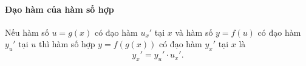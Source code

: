\paragraph{Đạo hàm của hàm số hợp}
\begin{dl}
	Nếu hàm số $u=g(x)$ có đạo hàm $u_x'$ tại $x$ và hàm số $y=f(u)$ có đạo hàm $y_u'$ tại $u$ thì hàm số hợp $y=f(g(x))$ có đạo hàm $y_x'$ tại $x$ là
	$$y_x'=y_u'\cdot u_x'.$$
\end{dl}
